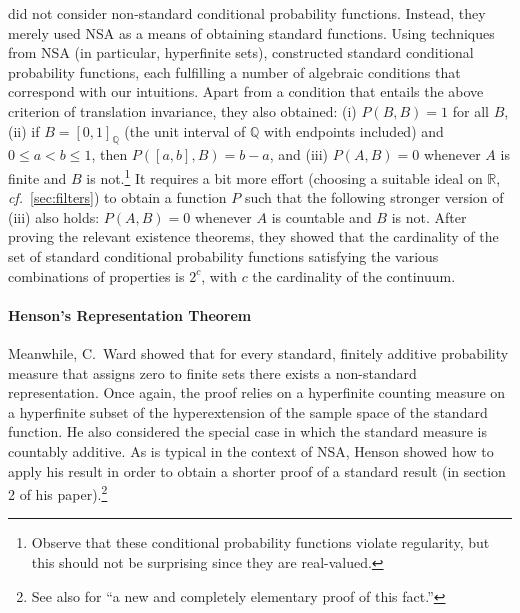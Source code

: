 \citeauthor{ParikhParnes:1974} did not consider non-standard conditional probability functions. Instead, they merely used NSA as a means of obtaining standard functions.
Using techniques from NSA (in particular, hyperfinite sets), \citeauthor{ParikhParnes:1974} constructed standard conditional probability functions, each fulfilling a number of algebraic conditions that correspond with our intuitions. Apart from a condition that entails the above criterion of translation invariance, they also obtained: (i) $P(B,B)=1$ for all $B$, (ii) if $B=[0,1]_\mathbb{Q}$ (the unit interval of $\mathbb{Q}$ with endpoints included) and $0 \leq a < b \leq 1$, then $P([a,b],B)=b-a$, and (iii) $P(A,B)=0$ whenever $A$ is finite and $B$ is not.\footnote{Observe that these conditional probability functions violate regularity, but this should not be surprising since they are real-valued.} It requires a bit more effort (choosing a suitable ideal on $\mathbb{R}$, \textit{cf.}\ \autoref{sec:filters}) to obtain a function $P$ such that the following stronger version of (iii) also holds: $P(A,B)=0$ whenever $A$ is countable and $B$ is not.
After proving the relevant existence theorems, they showed that the cardinality of the set of standard conditional probability functions satisfying the various combinations of properties is $2^c$, with $c$ the cardinality of the continuum.

\paragraph{Henson's Representation Theorem}
Meanwhile, C.~Ward \citet{Henson:1972} showed that for every standard, finitely additive probability measure that assigns zero to finite sets there exists a non-standard representation. Once again, the proof relies on a hyperfinite counting measure on a hyperfinite subset of the hyperextension of the sample space of the standard function. He also considered the special case in which the standard measure is countably additive. As is typical in the context of NSA, Henson showed how to apply his result in order to obtain a shorter proof of a standard result (in section 2 of his paper).\footnote{See also \citet{HofweberSchindler:2016} for ``a new and completely elementary proof of this fact.''}

